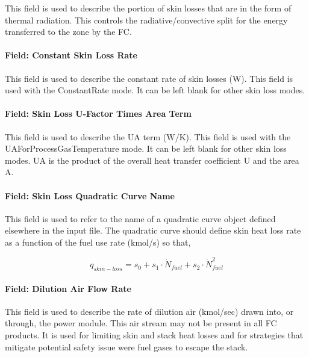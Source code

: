 This field is used to describe the portion of skin losses that are in the form of thermal radiation. This controls the radiative/convective split for the energy transferred to the zone by the FC.

\paragraph{Field: Constant Skin Loss Rate}\label{field-constant-skin-loss-rate}

This field is used to describe the constant rate of skin losses (W). This field is used with the ConstantRate mode. It can be left blank for other skin loss modes.

\paragraph{Field: Skin Loss U-Factor Times Area Term}\label{field-skin-loss-u-factor-times-area-term}

This field is used to describe the UA term (W/K). This field is used with the UAForProcessGasTemperature mode. It can be left blank for other skin loss modes. UA is the product of the overall heat transfer coefficient U and the area A.

\paragraph{Field: Skin Loss Quadratic Curve Name}\label{field-skin-loss-quadratic-curve-name}

This field is used to refer to the name of a quadratic curve object defined elsewhere in the input file. The quadratic curve should define skin heat loss rate as a function of the fuel use rate (kmol/s) so that,

\begin{equation}
{q_{skin - loss}} = {s_0} + {s_1} \cdot {\dot N_{fuel}} + {s_2} \cdot \dot N_{fuel}^2
\end{equation}

\paragraph{Field: Dilution Air Flow Rate}\label{field-dilution-air-flow-rate}

This field is used to describe the rate of dilution air (kmol/sec) drawn into, or through, the power module. This air stream may not be present in all FC products. It is used for limiting skin and stack heat losses and for strategies that mitigate potential safety issue were fuel gases to escape the stack.

